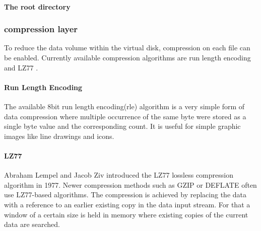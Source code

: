 \paragraph{The root directory}


\subsubsection{compression layer}

To reduce the data volume within the virtual disk, compression on each file can
be enabled. Currently available compression algorithms are run length encoding
\cite{rle} and LZ77 \cite{lz77}.

\paragraph{Run Length Encoding}

The available 8bit run length encoding(rle) algorithm is a very simple form of
data compression where multiple occurrence of the same byte were stored as a
single byte value and the corresponding count. It is useful for simple graphic
images like line drawings and icons.

\paragraph{LZ77}

Abraham Lempel and Jacob Ziv introduced the LZ77 lossless compression algorithm
in 1977. Newer compression methods such as GZIP or DEFLATE often use LZ77-based
algorithms. The compression is achieved by replacing the data with a reference
to an earlier existing copy in the data input stream. For that a window of
a certain size is held in memory where existing copies of the current data are
searched.
